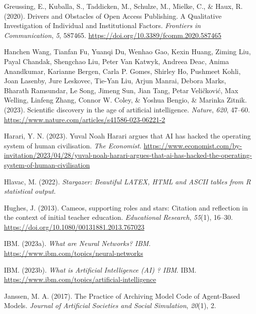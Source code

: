 \documentclass[
  letterpaper,
  DIV=11,
  numbers=noendperiod]{scrreprt}
\newlength{\cslhangindent}
\newenvironment{CSLReferences}[2] %
 {\begin{list}{}{%
  \setlength{\itemindent}{0pt}
  \setlength{\leftmargin}{0pt}
  \setlength{\parsep}{0pt}
  \ifodd #1
   \setlength{\leftmargin}{\cslhangindent}
   \setlength{\itemindent}{-1\cslhangindent}
  \fi
  \setlength{\itemsep}{#2\baselineskip}}}
 {\end{list}}
\begin{document}
\begin{CSLReferences}{1}{0}
Greussing, E., Kuballa, S., Taddicken, M., Schulze, M., Mielke, C., \&
Haux, R. (2020). Drivers and {Obstacles} of {Open Access Publishing}. {A
Qualitative Investigation} of {Individual} and {Institutional Factors}.
\emph{Frontiers in Communication}, \emph{5}, 587465.
\url{https://doi.org/10.3389/fcomm.2020.587465}

Hanchen Wang, Tianfan Fu, Yuanqi Du, Wenhao Gao, Kexin Huang, Ziming
Liu, Payal Chandak, Shengchao Liu, Peter Van Katwyk, Andreea Deac, Anima
Anandkumar, Karianne Bergen, Carla P. Gomes, Shirley Ho, Pushmeet Kohli,
Joan Lasenby, Jure Leskovec, Tie-Yan Liu, Arjun Manrai, Debora Marks,
Bharath Ramsundar, Le Song, Jimeng Sun, Jian Tang, Petar Veličković, Max
Welling, Linfeng Zhang, Connor W. Coley, \& Yoshua Bengio, \& Marinka
Zitnik. (2023). Scientific discovery in the age of artificial
intelligence. \emph{Nature}, \emph{620}, 47--60.
\url{https://www.nature.com/articles/s41586-023-06221-2}

Harari, Y. N. (2023). Yuval {Noah Harari} argues that {AI} has hacked
the operating system of human civilisation. \emph{The Economist}.
\url{https://www.economist.com/by-invitation/2023/04/28/yuval-noah-harari-argues-that-ai-has-hacked-the-operating-system-of-human-civilisation}

Hlavac, M. (2022). \emph{Stargazer: Beautiful {LATEX}, {HTML} and
{ASCII} tables from {R} statistical output}.

Hughes, J. (2013). Cameos, supporting roles and stars: Citation and
reflection in the context of initial teacher education.
\emph{Educational Research}, \emph{55}(1), 16--30.
\url{https://doi.org/10.1080/00131881.2013.767023}

IBM. (2023a). \emph{What are {Neural Networks}? \textbar{} {IBM}}.
\url{https://www.ibm.com/topics/neural-networks}

IBM. (2023b). \emph{What is {Artificial Intelligence} ({AI}) ?
\textbar{} {IBM}}. IBM.
\url{https://www.ibm.com/topics/artificial-intelligence}

Janssen, M. A. (2017). The {Practice} of {Archiving Model Code} of
{Agent-Based Models}. \emph{Journal of Artificial Societies and Social
Simulation}, \emph{20}(1), 2.


\end{CSLReferences}
\end{document}
